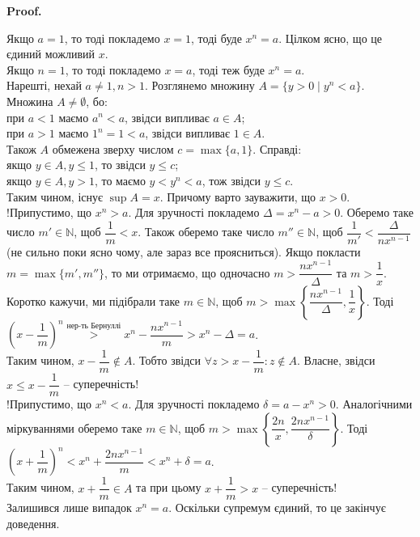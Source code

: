 \documentclass[a4paper, 14pt]{article}
\makeatletter
\def\qed{$\blacksquare$}
\theoremstyle{theoremdd}
\theoremstyle{theoremdd}
\theoremstyle{theoremdd}
\theoremstyle{theoremdd}
\theoremstyle{theoremdd}
\theoremstyle{theoremdd}
\theoremstyle{theoremdd}
\theoremstyle{theoremdd}
\renewenvironment{proof}[1][Proof.\\]{\par
\pushQED{\hfill \qed}%
\normalfont \topsep6\p@\@plus6\p@\relax
\trivlist
\item\relax
{\bfseries
#1\@addpunct{.}}\hspace\labelsep\ignorespaces
}{%
\popQED\endtrivlist\@endpefalse
}
\makeatother
\begin{document}
	\begin{proof}
	Якщо $a = 1$, то тоді покладемо $x = 1$, тоді буде $x^n = a$. Цілком ясно, що це єдиний можливий $x$.\\
	Якщо $n = 1$, то тоді покладемо $x = a$, тоді теж буде $x^n = a$.\\
	Нарешті, нехай $a \neq 1, n > 1$. Розглянемо множину $A = \{y > 0 \mid y^n < a\}$. Множина $A \neq \emptyset$, бо:\\
	при $a < 1$ маємо $a^n < a$, звідси випливає $a \in A$;\\
	при $a > 1$ маємо $1^n = 1 < a$, звідси випливає $1 \in A$.\\
	Також $A$ обмежена зверху числом $c = \max\{a,1\}$. Справді:\\
	якщо $y \in A, y \leq 1$, то звідси $y \leq c$;\\
	якщо  $y \in A, y > 1$, то маємо $y < y^n < a$, тож звідси $y \leq c$.\\
	Таким чином, існує $\sup A = x$. Причому варто зауважити, що $x > 0$.
	\bigskip \\
	!Припустимо, що $x^n > a$. Для зручності покладемо $\Delta = x^n - a > 0$. Оберемо таке число $m' \in \mathbb{N}$, щоб $\dfrac{1}{m} < x$. Також оберемо таке число $m'' \in \mathbb{N}$, щоб $\dfrac{1}{m'} < \dfrac{\Delta}{nx^{n-1}}$ (не сильно поки ясно чому, але зараз все проясниться). Якщо покласти $m = \max\{m',m''\}$, то ми отримаємо, що одночасно $m > \dfrac{nx^{n-1}}{\Delta}$ та $m > \dfrac{1}{x}$. Коротко кажучи, ми підібрали таке $m \in \mathbb{N}$, щоб $m > \max\left\{ \dfrac{nx^{n-1}}{\Delta}, \dfrac{1}{x} \right\}$. Тоді\\
	$\left(x - \dfrac{1}{m}\right)^n \overset{\text{нер-ть Бернуллі}}{>} x^n - \dfrac{nx^{n-1}}{m} > x^n - \Delta = a$.\\
	\iffalse Власне кажучи, мені була потрібна нерівність $m > \dfrac{nx^{n-1}}{\Delta}$, щоб можна було отримати другу нерівність з останнього ланцюга. \fi
	Таким чином, $x-\dfrac{1}{m} \notin A$. Тобто звідси $\forall z > x - \dfrac{1}{m}: z \notin A$. Власне, звідси $x \leq x - \dfrac{1}{m}$ -- суперечність!
	\bigskip \\
	!Припустимо, що $x^n < a$. Для зручності покладемо $\delta = a - x^n > 0$. Аналогічними міркуваннями оберемо таке $m \in \mathbb{N}$, щоб $m > \max\left\{ \dfrac{2n}{x}, \dfrac{2nx^{n-1}}{\delta} \right\}$. Тоді\\
	$\left( x + \dfrac{1}{m} \right)^n < x^n + \dfrac{2nx^{n-1}}{m} < x^n + \delta = a$.\\
	Таким чином, $x + \dfrac{1}{m} \in A$ та при цьому $x + \dfrac{1}{m} > x$ -- суперечність!
	\bigskip \\
	Залишився лише випадок $x^n = a$. Оскільки супремум єдиний, то це закінчує доведення.
	\end{proof}
	
\end{document}

